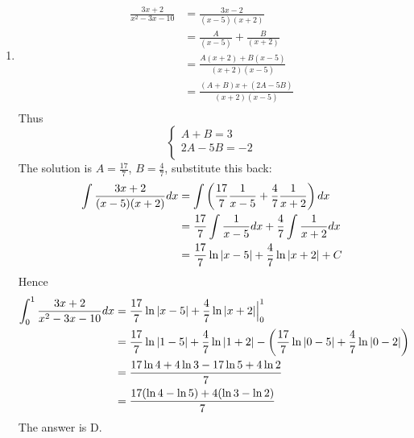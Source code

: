 \documentclass{article}
\numberwithin{equation}{section}
\begin{document}
\begin{enumerate}
    \item 
    \begin{align*}
    \frac{3x+2}{x^2-3x-10} &= \frac{3x-2}{(x-5)(x+2)}\\
    &= \frac{A}{(x-5)} + \frac{B}{(x+2)}\\
    &= \frac{A(x+2) + B(x-5)}{(x+2)(x-5)}\\
    &= \frac{(A+B)x + (2A-5B)}{(x+2)(x-5)}\\
    \end{align*}
    Thus
    \[
    \begin{cases}
        A + B = 3\\
        2A - 5B = -2\\
    \end{cases}
    \]
    The solution is $A = \frac{17}{7}$, $B = \frac{4}{7}$, substitute this back:
    \begin{align*}
        \int \frac{3x+2}{(x-5)(x+2)} dx &= \int \left(\frac{17}{7}\frac{1}{x-5} + \frac{4}{7}\frac{1}{x+2}\right)dx\\
        &= \frac{17}{7}\int \frac{1}{x-5}dx + \frac{4}{7}\int \frac{1}{x+2} dx\\
        &= \frac{17}{7} \ln \abs{x-5} +\frac{4}{7}\ln \abs{x+2}+C\\
    \end{align*}
    Hence
    \begin{align*}
        \int_{0}^{1} \frac{3x+2}{x^2 -3x-10}dx &= \frac{17}{7} \ln \abs{x-5} +\frac{4}{7}\ln \abs{x+2} \Big|_0^1\\
        &= \frac{17}{7} \ln \abs{1-5} + \frac{4}{7}\ln \abs{1+2} - \left(\frac{17}{7}\ln \abs{0-5} + \frac{4}{7} \ln \abs{0-2}\right)\\
        &= \frac{17 \ln 4 + 4 \ln 3 - 17\ln 5 + 4\ln 2}{7}\\
        &= \frac{17(\ln 4 - \ln 5) + 4(\ln 3 - \ln 2)}{7}
    \end{align*}
    The answer is D.


\end{enumerate}
\end{document}
